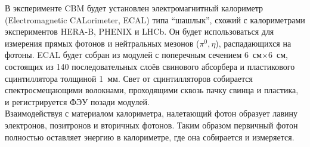\begin{minipage}[t]{0.495\textwidth}
В эксперименте CBM будет установлен электромагнитный калориметр (Electromagnetic CALorimeter, ECAL) типа ``шашлык'', схожий с калориметрами экспериментов HERA-B, PHENIX и LHCb. Он будет использоваться для измерения прямых фотонов и нейтральных мезонов ($ \pi^{0}, \eta $), распадающихся на фотоны.
ECAL будет собран из модулей с поперечным сечением 6~см$\times$6~см, состоящих из 140 последовательных слоёв свинового абсорбера и пластикового сцинтиллятора толщиной 1~мм. Свет от сцинтилляторов собирается спектросмещающими волокнами, проходящими сквозь пачку свинца и пластика, и регистрируется ФЭУ позади модулей. \\
Взаимодействуя с материалом калориметра, налетающий фотон образует лавину электронов, позитронов и вторичных фотонов. Таким образом первичный фотон полностью оставляет энергию в калориметре, где она собирается и измеряется. \\

\end{minipage}
